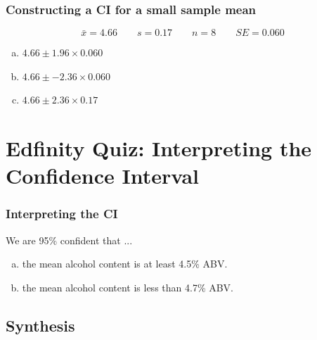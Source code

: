 \documentclass[slidestop,compress,mathserif]{beamer}
\newcommand{\soln}[1]{\textit{#1}}
\begin{document}
\begin{frame}
\frametitle{Constructing a CI for a small sample mean}

\[ \bar{x} = 4.66 \qquad s = 0.17 \qquad n = 8 \qquad SE = 0.060 \]

{
\begin{enumerate}[(a)]
\item $4.66 \pm 1.96 \times 0.060$
\item $4.66 \pm -2.36 \times 0.060$
\item $4.66 \pm 2.36 \times 0.17$
\end{enumerate}
}
{
\soln{}
\vspace{0.25cm}
}

\end{frame}


\section{Edfinity Quiz: Interpreting the Confidence Interval}



\begin{frame}
\frametitle{Interpreting the CI}


We are 95\% confident that ...

\begin{enumerate}[(a)]
\item the mean alcohol content is at least 4.5\% ABV.
\item the mean alcohol content is less than 4.7\% ABV.
\end{enumerate}

\end{frame}


\subsection{Synthesis}
\end{document}
